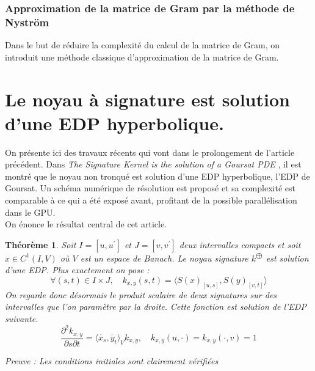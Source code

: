 \documentclass[10pt,a4paper]{article}
\newtheorem{theoreme}{Théorème}
\begin{document}
\subsubsection{Approximation de la matrice de Gram par la méthode de Nyström}
Dans le but de réduire la complexité du calcul de la matrice de Gram, on introduit une méthode classique d'approximation de la matrice de Gram.\cite{nystrom}



\section{Le noyau à signature est solution d'une EDP hyperbolique.}

On présente ici des travaux récents qui vont dans le prolongement de l'article précédent. Dans \textit{The Signature Kernel is the solution of a Goursat PDE} \cite{goursat}, il est montré que le noyau non tronqué est solution d'une EDP hyperbolique, l'EDP de Goursat. Un schéma numérique de résolution est proposé et sa complexité est comparable à ce qui a été exposé avant, profitant de la possible parallélisation dans le GPU. \\

On énonce le résultat central de cet article.
\begin{theoreme}
Soit $I=[u, u^{'} ]$ et $J = [v, v^{'} ]$ deux intervalles compacts et soit $x \in C^1 (I,V)$ où $V$ est un espace de Banach. Le noyau signature $k^{\bigoplus}$ est solution d'une EDP. Plus exactement on pose :
\[ \forall (s,t) \in I\times J, \quad k_{x,y}(s,t) = \langle S(x)_{[u, s]} , S(y)_{[v, t]} \rangle
\]
On regarde donc désormais le produit scalaire de deux signatures sur des intervalles que l'on paramètre par la droite. Cette fonction est solution de l'EDP suivante.
\[
\frac{\partial^2 k_{x,y}}{\partial s \partial t} = \langle \dot{x_s}, \dot{y_t} \rangle_V k_{x,y}, \quad k_{x,y}(u, \cdot) = k_{x,y}(\cdot , v) = 1
\]

Preuve :
Les conditions initiales sont clairement vérifiées 
\[
\]


\end{theoreme}


\end{document}
